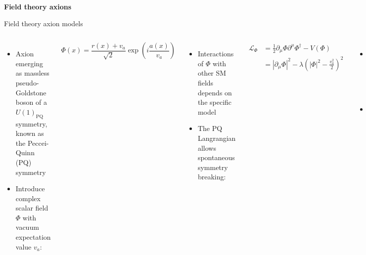 \documentclass[aspectratio=1610, 9pt]{beamer}
\begin{document}
\begin{frame}[noframenumbering]
  \centering
  \Huge \textbf{\textcolor{tugreen}{Field theory axions}}
\end{frame}

\begin{frame}{Field theory axion models}
  \begin{columns}
    \column{\textwidth}
    \begin{itemize}
      \item Axion emerging as massless pseudo-Goldstone boson of a $U(1)_{\text{PQ}}$ symmetry, known as the Peccei-Quinn (PQ) symmetry
      \item Introduce complex scalar field $\Phi$ with vacuum expectation value $v_a$:
    \end{itemize}
    \begin{equation*}
      \Phi(x) = \frac{r(x)+v_a}{\sqrt{2}}\exp \left(i\frac{a(x)}{v_a}\right) 
    \end{equation*}
    \begin{itemize}
      \item Interactions of $\Phi$ with other SM fields depends on the specific model
      \item The PQ Langrangian allows spontaneous symmetry breaking:
    \end{itemize}
    \begin{align*}
      \mathcal{L}_{\Phi} &= \frac{1}{2} \partial_\mu \Phi \partial^\mu \Phi^\dagger - V(\Phi) \\
      & =  {| \partial_\mu \Phi |}^2 - \lambda \left( |\Phi|^2 - \frac{v_a^2}{2} \right)^2
    \end{align*}
    \begin{itemize}
      \item PQ symmetry is spontaneously broken below high scale $f_a$
      \item Axion aqquires mass due to QCD potential
    \end{itemize}
  \end{columns} 
\end{frame}
\end{document}
